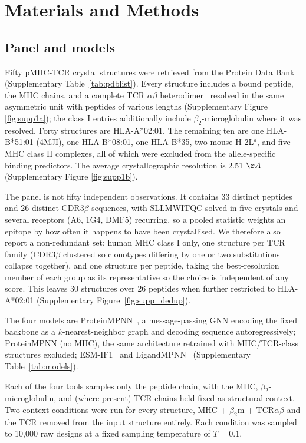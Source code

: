 \documentclass[letterpaper]{article}
\begin{document}
\section{Materials and Methods}
\label{sec:methods}

\subsection{Panel and models}
Fifty pMHC-TCR crystal structures were retrieved from the Protein Data Bank~\citep{berman2000pdb} (Supplementary Table~\ref{tab:pdblist}). Every structure includes a bound peptide, the MHC chains, and a complete TCR $\alpha\beta$ heterodimer~\citep{bjorkman1987structure} resolved in the same asymmetric unit with peptides of various lengths (Supplementary Figure \ref{fig:supp1a}); the class I entries additionally include $\beta_2$-microglobulin where it was resolved. Forty structures are HLA-A*02:01. The remaining ten are one HLA-B*51:01 (4MJI), one HLA-B*08:01, one HLA-B*35, two mouse H-2L$^d$, and five MHC class II complexes, all of which were excluded from the allele-specific binding predictors. The average crystallographic resolution is 2.51 $\AA$ (Supplementary Figure \ref{fig:supp1b}).

The panel is not fifty independent observations. It contains 33 distinct peptides and 26 distinct CDR3$\beta$ sequences, with SLLMWITQC solved in five crystals and several receptors (A6, 1G4, DMF5) recurring, so a pooled statistic weights an epitope by how often it happens to have been crystallised. We therefore also report a non-redundant set: human MHC class I only, one structure per TCR family (CDR3$\beta$ clustered so clonotypes differing by one or two substitutions collapse together), and one structure per peptide, taking the best-resolution member of each group as its representative so the choice is independent of any score. This leaves 30 structures over 26 peptides when further restricted to HLA-A*02:01 (Supplementary Figure~\ref{fig:supp_dedup}).

The four models are ProteinMPNN~\citep{dauparas2022proteinmpnn}, a message-passing GNN encoding the fixed backbone as a $k$-nearest-neighbor graph and decoding sequence autoregressively; ProteinMPNN (no MHC), the same architecture retrained with MHC/TCR-class structures excluded; ESM-IF1~\citep{hsu2022esmif} and LigandMPNN~\citep{dauparas2025ligandmpnn} (Supplementary Table~\ref{tab:models}).

Each of the four tools samples only the peptide chain, with the MHC, $\beta_2$-microglobulin, and (where present) TCR chains held fixed as structural context. Two context conditions were run for every structure, MHC + $\beta_2$m + TCR$\alpha\beta$ and the TCR removed from the input structure entirely. Each condition was sampled to 10,000 raw designs at a fixed sampling temperature of $T=0.1$.
\end{document}
